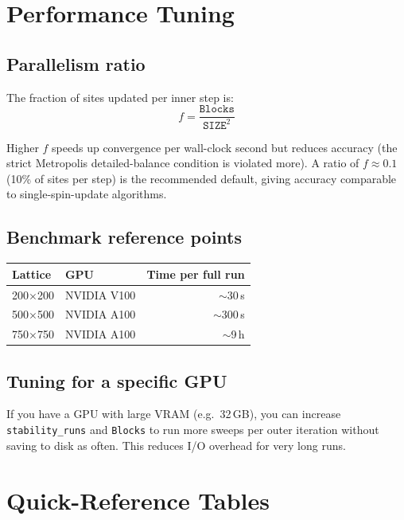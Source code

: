\documentclass[12pt,a4paper]{article}
\newcommand{\param}[1]{\texttt{#1}}
\begin{document}
\section{Performance Tuning}
\label{sec:perf}

\subsection{Parallelism ratio}

The fraction of sites updated per inner step is:
\[
  f = \frac{\texttt{Blocks}}{\texttt{SIZE}^2}
\]

Higher $f$ speeds up convergence per wall-clock second but reduces accuracy (the
strict Metropolis detailed-balance condition is violated more). A ratio of
$f \approx 0.1$ (10\% of sites per step) is the recommended default, giving
accuracy comparable to single-spin-update algorithms.

\subsection{Benchmark reference points}

\begin{center}
\begin{tabular}{llr}
\toprule
\textbf{Lattice} & \textbf{GPU} & \textbf{Time per full run} \\
\midrule
200$\times$200 & NVIDIA V100 & $\sim$30\,s \\
500$\times$500 & NVIDIA A100 & $\sim$300\,s \\
750$\times$750 & NVIDIA A100 & $\sim$9\,h \\
\bottomrule
\end{tabular}
\end{center}

\subsection{Tuning for a specific GPU}

If you have a GPU with large VRAM (e.g.\ 32\,GB), you can increase
\param{stability\_runs} and \param{Blocks} to run more sweeps per outer
iteration without saving to disk as often. This reduces I/O overhead for very
long runs.

\section{Quick-Reference Tables}
\label{sec:ref}
\end{document}
